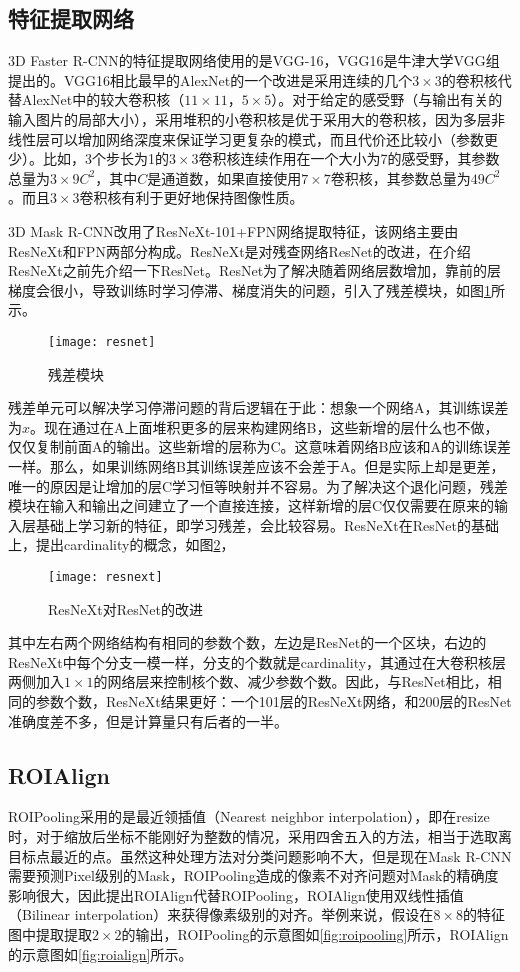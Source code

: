 \subsection{特征提取网络}
3D Faster R-CNN的特征提取网络使用的是VGG-16\cite{simonyan2014very}，VGG16是牛津大学VGG组提出的。VGG16相比最早的AlexNet的一个改进是采用连续的几个$3\times 3$的卷积核代替AlexNet中的较大卷积核（$11\times 11$，$5\times 5$）。对于给定的感受野（与输出有关的输入图片的局部大小），采用堆积的小卷积核是优于采用大的卷积核，因为多层非线性层可以增加网络深度来保证学习更复杂的模式，而且代价还比较小（参数更少）。比如，3个步长为1的$3\times 3$卷积核连续作用在一个大小为7的感受野，其参数总量为$3\times 9C^2$，其中$C$是通道数，如果直接使用$7\times 7$卷积核，其参数总量为$49C^2$。而且$3\times 3$卷积核有利于更好地保持图像性质。

3D Mask R-CNN改用了ResNeXt-101+FPN网络提取特征，该网络主要由ResNeXt\cite{xie2017aggregated}和FPN\cite{lin2017feature}两部分构成。ResNeXt是对残查网络ResNet\cite{he2016deep}的改进，在介绍ResNeXt之前先介绍一下ResNet。ResNet为了解决随着网络层数增加，靠前的层梯度会很小，导致训练时学习停滞、梯度消失的问题，引入了残差模块，如图\ref{fig:resnet}所示。
\begin{figure}[ht]
  \centering
  \texttt{[image: resnet]}
  \caption{残差模块}
  \label{fig:resnet}
\end{figure}
残差单元可以解决学习停滞问题的背后逻辑在于此：想象一个网络A，其训练误差为$x$。现在通过在A上面堆积更多的层来构建网络B，这些新增的层什么也不做，仅仅复制前面A的输出。这些新增的层称为C。这意味着网络B应该和A的训练误差一样。那么，如果训练网络B其训练误差应该不会差于A。但是实际上却是更差，唯一的原因是让增加的层C学习恒等映射并不容易。为了解决这个退化问题，残差模块在输入和输出之间建立了一个直接连接，这样新增的层C仅仅需要在原来的输入层基础上学习新的特征，即学习残差，会比较容易。ResNeXt在ResNet的基础上，提出cardinality的概念，如图\ref{fig:resnext}，
\begin{figure}[ht]
  \centering
  \texttt{[image: resnext]}
  \caption{ResNeXt对ResNet的改进}
  \label{fig:resnext}
\end{figure}
其中左右两个网络结构有相同的参数个数，左边是ResNet的一个区块，右边的ResNeXt中每个分支一模一样，分支的个数就是cardinality，其通过在大卷积核层两侧加入$1\times 1$的网络层来控制核个数、减少参数个数。因此，与ResNet相比，相同的参数个数，ResNeXt结果更好：一个101层的ResNeXt网络，和200层的ResNet准确度差不多，但是计算量只有后者的一半。

\subsection{ROIAlign}
ROIPooling采用的是最近领插值（Nearest neighbor interpolation），即在resize时，对于缩放后坐标不能刚好为整数的情况，采用四舍五入的方法，相当于选取离目标点最近的点。虽然这种处理方法对分类问题影响不大，但是现在Mask R-CNN需要预测Pixel级别的Mask，ROIPooling造成的像素不对齐问题对Mask的精确度影响很大，因此提出ROIAlign代替ROIPooling，ROIAlign使用双线性插值（Bilinear interpolation）来获得像素级别的对齐。举例来说，假设在$8\times 8$的特征图中提取提取$2\times 2$的输出，ROIPooling的示意图如\ref{fig:roipooling}所示，ROIAlign的示意图如\ref{fig:roialign}所示。

